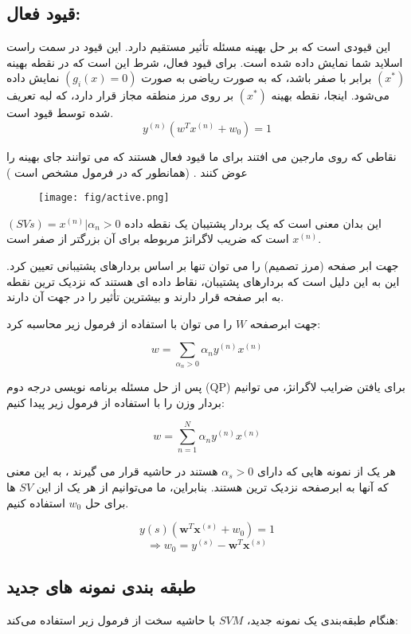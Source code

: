 \documentclass[12pt]{article}
\begin{document}
\subsection{قیود فعال:}
 این قیودی است که بر حل بهینه مسئله تأثیر مستقیم دارد. این قیود در سمت راست اسلاید شما نمایش داده شده است. برای قیود فعال، شرط این است که در نقطه بهینه 
$(x^*)$
برابر با صفر باشد، که به صورت ریاضی به صورت 
$(g_i(x) = 0)$ نمایش داده می‌شود. 
اینجا، نقطه بهینه 
$(x^*)$ 
بر روی مرز منطقه مجاز قرار دارد، که لبه تعریف شده توسط قیود است.
$$y^{(n)} (w^Tx^{(n)} + w_0) = 1$$

نقاطی که روی مارجین می افتند برای ما قیود فعال هستند که می توانند جای بهینه را عوض کنند . (همانطور که در فرمول مشخص است )

\begin{figure}[!h]
\centering
\texttt{[image: fig/active.png]}

\label{fig:active}
\end{figure}


$(SVs) = {x^{(n)} | \alpha_n > 0 }$
این بدان معنی است که یک بردار پشتیبان یک نقطه داده
$x^{(n)}$
است که ضریب لاگرانژ مربوطه برای آن بزرگتر از صفر است.

جهت ابر صفحه (مرز تصمیم) را می توان تنها بر اساس بردارهای پشتیبانی تعیین کرد. این به این دلیل است که بردارهای پشتیبان، نقاط داده ای هستند که نزدیک ترین نقطه به ابر صفحه قرار دارند و بیشترین تأثیر را در جهت آن دارند.


جهت ابرصفحه $W$ را می توان با استفاده از فرمول زیر محاسبه کرد:

$$w = \sum_{\alpha_n > 0 } \alpha_n y^{(n)} x^{(n)}$$


پس از حل مسئله برنامه نویسی درجه دوم (QP) برای یافتن ضرایب لاگرانژ، می توانیم بردار وزن را با استفاده از فرمول زیر پیدا کنیم:

$$w = \sum_{n=1}^{N} \alpha_n y^{(n)} x^{(n)}$$

هر یک از نمونه هایی که دارای
$\alpha_s > 0$
هستند در حاشیه قرار می گیرند
، به این معنی که آنها به ابرصفحه نزدیک ترین هستند. بنابراین، ما می‌توانیم از هر یک از این $SV$
ها برای حل
$w_0$
استفاده کنیم.

$$y(s)(\mathbf{w}^T \mathbf{x}^(s) + w_0) = 1$$
$$\Rightarrow w_0 = y^{(s)} - \mathbf{w}^T \mathbf{x}^{(s)}$$

\subsection{طبقه بندی نمونه های جدید}

هنگام طبقه‌بندی یک نمونه جدید، $SVM$ با حاشیه سخت از فرمول زیر استفاده می‌کند:
\end{document}
